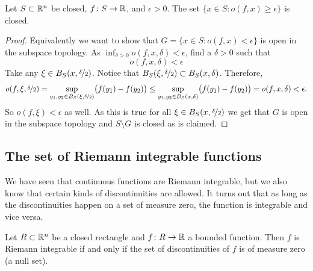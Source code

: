 \begin{prop} \label{prop:seclosed}
Let $S \subset {\mathbb{R}}^n$ be closed,
$f \colon S \to {\mathbb{R}}$, and $\epsilon > 0$.
The set $\{ x \in S : o(f,x) \geq \epsilon \}$ is closed.
\end{prop}

\begin{proof}
Equivalently we want to show that
$G = \{ x \in S : o(f,x) < \epsilon \}$ is open in the subspace topology.
As $\inf_{\delta > 0} o(f,x,\delta) < \epsilon$, find a $\delta > 0$ such
that
\begin{equation*}
o(f,x,\delta) < \epsilon
\end{equation*}
Take any $\xi \in B_S(x,\nicefrac{\delta}{2})$.  Notice that
$B_S(\xi,\nicefrac{\delta}{2}) \subset B_S(x,\delta)$.  Therefore,
\begin{equation*}
o(f,\xi,\nicefrac{\delta}{2}) =
\sup_{y_1,y_2 \in B_S(\xi,\nicefrac{\delta}{2})} \bigl(f(y_1)-f(y_2)\bigr) 
\leq
\sup_{y_1,y_2 \in B_S(x,\delta)} \bigl(f(y_1)-f(y_2)\bigr) = o(f,x,\delta) <
\epsilon .
\end{equation*}
So $o(f,\xi) < \epsilon$ as well.  As this is true for all $\xi \in
B_S(x,\nicefrac{\delta}{2})$ we get that $G$ is open in the subspace
topology and $S \setminus G$ is closed as is claimed.
\end{proof}


\subsection{The set of Riemann integrable functions}

We have seen that continuous functions are Riemann integrable, but we also
know that certain kinds of discontinuities are allowed.
It turns out that as long as the discontinuities happen on a set of measure
zero, the function is integrable and vice versa.

\begin{thm}
Let $R \subset {\mathbb{R}}^n$ be a closed rectangle and $f \colon R \to {\mathbb{R}}$
a bounded function.  Then $f$ is Riemann integrable if and only if
the set of discontinuities of $f$ is of measure zero (a null set).
\end{thm}

